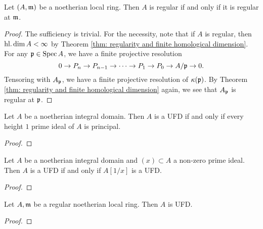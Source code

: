     \begin{corollary}\label{cor: regular local ring is regular}
        Let \((A,{\mathfrak{m}})\) be a noetherian local ring.
        Then \(A\) is regular if and only if it is regular at \({\mathfrak{m}}\).
    \end{corollary}
    \begin{proof}
        The sufficiency is trivial.
        For the necessity, note that if \(A\) is regular, then \(\operatorname{hl.dim} A < \infty\) by Theorem \ref{thm: regularity and finite homological dimension}.
        For any \({\mathfrak{p}} \in \operatorname{Spec} A\), we have a finite projective resolution 
        \[ 0 \to P_n \to P_{n-1} \to \cdots \to P_1 \to P_0 \to A/{\mathfrak{p}} \to 0. \]
        Tensoring with \(A_{\mathfrak{p}}\), we have a finite projective resolution of \({\kappa}({\mathfrak{p}})\).
        By Theorem \ref{thm: regularity and finite homological dimension} again, we see that \(A_{\mathfrak{p}}\) is regular at \({\mathfrak{p}}\).
    \end{proof}


    \begin{lemma}\label{lem: UFD iff height 1 prime is principal}
        Let \(A\) be a noetherian integral domain.
        Then \(A\) is a UFD if and only if every height \(1\) prime ideal of \(A\) is principal.
    \end{lemma}
    \begin{proof}
    \end{proof}

    \begin{lemma}\label{lem: UFD iff localization at prime element x is UFD}
        Let \(A\) be a noetherian integral domain and \((x) \subset A\) a non-zero prime ideal.
        Then \(A\) is a UFD if and only if \(A[1/x]\) is a UFD.
    \end{lemma}
    \begin{proof}
    \end{proof}

    \begin{theorem}\label{thm: regular local ring is UFD}
        Let \(A,{\mathfrak{m}}\) be a regular noetherian local ring.
        Then \(A\) is UFD.
    \end{theorem}
    \begin{proof}
    \end{proof}